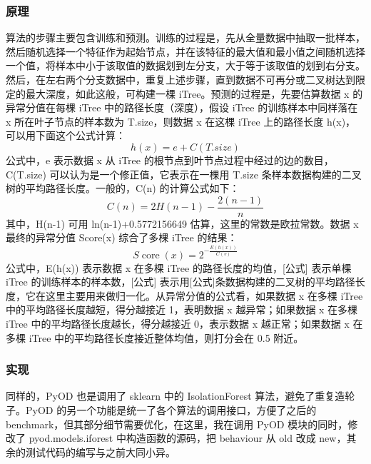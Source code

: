 \documentclass[UTF8]{ctexart}
\begin{document}
        \subsubsection{原理}
            算法的步骤主要包含训练和预测。训练的过程是，先从全量数据中抽取一批样本，然后随机选择一个特征作为起始节点，并在该特征的最大值和最小值之间随机选择一个值，将样本中小于该取值的数据划到左分支，大于等于该取值的划到右分支。然后，在左右两个分支数据中，重复上述步骤，直到数据不可再分或二叉树达到限定的最大深度，如此这般，可构建一棵 iTree。预测的过程是，先要估算数据 x 的异常分值在每棵 iTree 中的路径长度（深度），假设 iTree 的训练样本中同样落在 x 所在叶子节点的样本数为 T.size，则数据 x 在这棵 iTree 上的路径长度 h(x)，可以用下面这个公式计算：$$h(x)=e+C(T . { size })$$ 公式中，e 表示数据 x 从 iTree 的根节点到叶节点过程中经过的边的数目，C(T.size) 可以认为是一个修正值，它表示在一棵用 T.size 条样本数据构建的二叉树的平均路径长度。一般的，C(n) 的计算公式如下：$$ C(n)=2 H(n-1)-\frac{2(n-1)}{n} $$ 其中，H(n-1) 可用 ln(n-1)+0.5772156649 估算，这里的常数是欧拉常数。数据 x 最终的异常分值 Score(x) 综合了多棵 iTree 的结果：$$ S \operatorname{core}(x)=2^{-\frac{E(h(x))}{C(v)}} $$ 公式中，E(h(x)) 表示数据 x 在多棵 iTree 的路径长度的均值，[公式] 表示单棵 iTree 的训练样本的样本数，[公式] 表示用[公式]条数据构建的二叉树的平均路径长度，它在这里主要用来做归一化。从异常分值的公式看，如果数据 x 在多棵 iTree 中的平均路径长度越短，得分越接近 1，表明数据 x 越异常；如果数据 x 在多棵 iTree 中的平均路径长度越长，得分越接近 0，表示数据 x 越正常；如果数据 x 在多棵 iTree 中的平均路径长度接近整体均值，则打分会在 0.5 附近。 \cite{link6}

        \subsubsection{实现}
            同样的，PyOD 也是调用了 sklearn 中的 IsolationForest 算法，避免了重复造轮子。PyOD 的另一个功能是统一了各个算法的调用接口，方便了之后的 benchmark，但其部分细节需要优化，在这里，我在调用 PyOD 模块的同时，修改了 pyod.models.iforest 中构造函数的源码，把 behaviour 从 old 改成 new，其余的测试代码的编写与之前大同小异。
\end{document}
